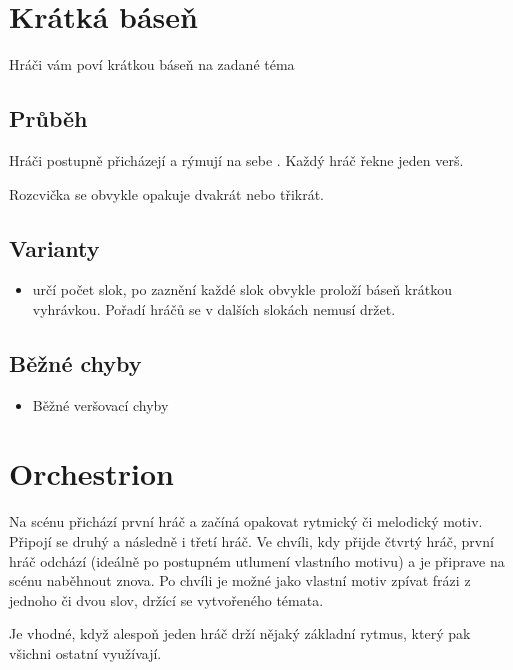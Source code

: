 \documentclass[main.tex]{subfiles}
\begin{document}
 
 
 
 
 
\needspace{5cm} \section{Krátká báseň} \label{krátká báseň}  
 
 
Hráči vám poví krátkou báseň na zadané téma 
 
 
\subsection{ Průběh } Hráči postupně přicházejí a rýmují na sebe . 
Každý hráč řekne jeden verš.  
 
Rozcvička se obvykle opakuje dvakrát nebo třikrát. 
\subsection{ Varianty } \begin{itemize}
\item  {} určí počet slok, po zaznění každé slok obvykle  proloží báseň krátkou vyhrávkou. Pořadí hráčů se v dalších slokách nemusí držet.
\end{itemize}
 
\subsection{ Běžné chyby } \begin{itemize}
\item  Běžné veršovací chyby
\end{itemize}
 
 
 
 
\needspace{5cm} \section{Orchestrion} \label{orchestrion} Na scénu přichází první hráč a začíná opakovat rytmický či melodický motiv. Připojí se druhý a následně i třetí hráč. Ve chvíli, kdy přijde čtvrtý hráč, první hráč odchází (ideálně po postupném utlumení vlastního motivu) a je připrave na scénu naběhnout znova. 
Po chvíli je možné jako vlastní motiv zpívat frázi z jednoho či dvou slov, držící se vytvořeného témata. 
 
Je vhodné, když alespoň jeden hráč drží nějaký základní rytmus, který pak všichni ostatní využívají. 
 
\end{document}
